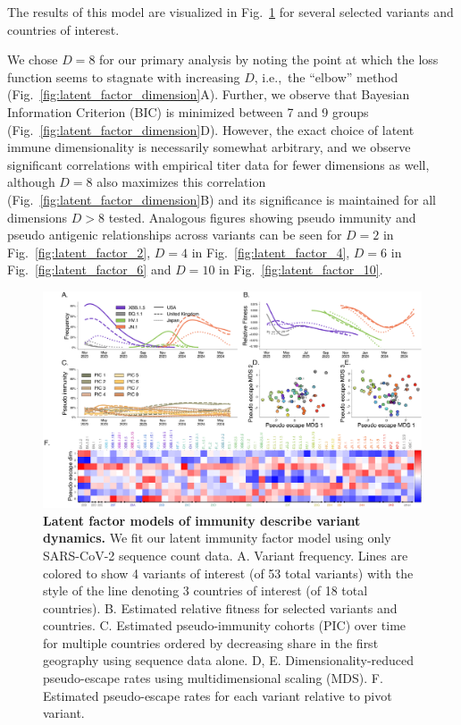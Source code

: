 \documentclass[11pt,oneside,letterpaper]{article}
\begin{document}
The results of this model are visualized in Fig.~\ref{fig:latent_immune} for several selected variants and countries of interest.

We chose $D=8$ for our primary analysis by noting the point at which the loss function seems to stagnate with increasing $D$, i.e.,\ the ``elbow'' method (Fig.~\ref{fig:latent_factor_dimension}A).
Further, we observe that Bayesian Information Criterion (BIC) is minimized between 7 and 9 groups (Fig.~\ref{fig:latent_factor_dimension}D).
However, the exact choice of latent immune dimensionality is necessarily somewhat arbitrary, and we observe significant correlations with empirical titer data for fewer dimensions as well, although $D=8$ also maximizes this correlation (Fig.~\ref{fig:latent_factor_dimension}B) and its significance is maintained for all dimensions $D > 8$ tested.
Analogous figures showing pseudo immunity and pseudo antigenic relationships across variants can be seen for $D=2$ in Fig.~\ref{fig:latent_factor_2}, $D=4$ in Fig.~\ref{fig:latent_factor_4}, $D=6$ in Fig.~\ref{fig:latent_factor_6} and $D=10$ in Fig.~\ref{fig:latent_factor_10}.


\begin{figure}[h]
    \centering
    \includegraphics[width=1.0\linewidth]{./figures/latent_immune.png}
    \caption{
      \textbf{Latent factor models of immunity describe variant dynamics.}
      We fit our latent immunity factor model using only SARS-CoV-2 sequence count data.
      A. Variant frequency. Lines are colored to show 4 variants of interest (of 53 total variants) with the style of the line denoting 3 countries of interest (of 18 total countries).
      B. Estimated relative fitness for selected variants and countries.
      C. Estimated pseudo-immunity cohorts (PIC) over time for multiple countries ordered by decreasing share in the first geography using sequence data alone.
      D, E. Dimensionality-reduced pseudo-escape rates using multidimensional scaling (MDS).
      F. Estimated pseudo-escape rates for each variant relative to pivot variant.
    }
    \label{fig:latent_immune}
\end{figure}
\end{document}
